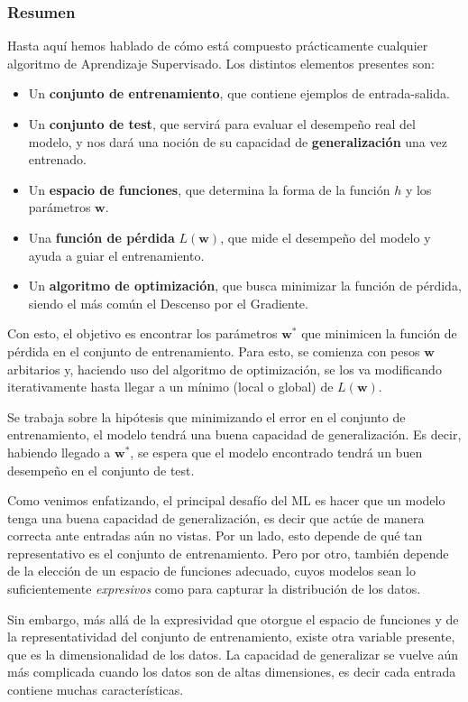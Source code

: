 \documentclass[../../main.tex]{subfiles}
\begin{document}
\subsubsection{Resumen}
Hasta aquí hemos hablado de cómo está compuesto prácticamente cualquier algoritmo de
Aprendizaje Supervisado. Los distintos elementos presentes son:
\begin{itemize}[noitemsep]
    \item Un \textbf{conjunto de entrenamiento}, que contiene ejemplos de entrada-salida.
    \item Un \textbf{conjunto de test}, que servirá para evaluar el desempeño real del modelo,
    y nos dará una noción de su capacidad de \textbf{generalización} una vez entrenado.
    \item Un \textbf{espacio de funciones}, que determina la forma de la función \(h\) y los
    parámetros \(\bm{w}\).
    \item Una \textbf{función de pérdida} \(L(\bm{w})\), que mide el desempeño del modelo
    y ayuda a guiar el entrenamiento.
    \item Un \textbf{algoritmo de optimización}, que busca minimizar la función de pérdida,
    siendo el más común el Descenso por el Gradiente.
\end{itemize}

Con esto, el objetivo es encontrar los parámetros \(\bm{w}^*\) que minimicen la función de
pérdida en el conjunto de entrenamiento. Para esto, se comienza con pesos \(\bm{w}\)
arbitarios y, haciendo uso del algoritmo de optimización, se los va modificando iterativamente
hasta llegar a un mínimo (local o global) de \(L(\bm{w})\).

Se trabaja sobre la hipótesis que minimizando el error en el conjunto de entrenamiento, el
modelo tendrá una buena capacidad de generalización. Es decir, habiendo llegado a
\(\bm{w}^*\), se espera que el modelo encontrado tendrá un buen desempeño en el
conjunto de test.

\bigskip
Como venimos enfatizando, el principal desafío del ML es hacer que un modelo tenga una
buena capacidad de generalización, es decir que actúe de manera correcta ante entradas aún
no vistas. Por un lado, esto depende de qué tan representativo es el conjunto de
entrenamiento. Pero por otro, también depende de la elección de un espacio de
funciones adecuado, cuyos modelos sean lo suficientemente \textit{expresivos} como para
capturar la distribución de los datos.

Sin embargo, más allá de la expresividad que otorgue el espacio de funciones y de la
representatividad del conjunto de entrenamiento, existe otra variable presente, que es la
dimensionalidad de los datos. La capacidad de generalizar se vuelve aún más complicada
cuando los datos son de altas dimensiones, es decir cada entrada contiene muchas
características.
\end{document}
